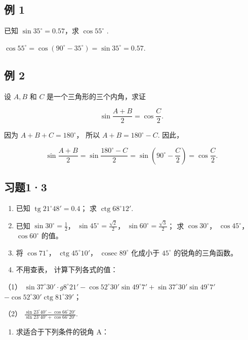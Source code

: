 \subsection{例 1}

已知 \(\sin35^{\circ}=0.57\)，求 \(\cos55^{\circ}\) .

\(\cos 55^{\circ} = \cos (90^{\circ} - 35^{\circ}) = \sin 35^{\circ} = 0.57.\)

\subsection{例 2}

设 \(A, B\) 和 \(C\) 是一个三角形的三个内角，求证

\[
\sin\frac{A+B}{2}=\cos\frac{C}{2}.
\]

 因为 \(A + B + C = 180^{\circ}\)， 所以
\(A + B = 180^{\circ} - C\). 因此，

\[
\sin \frac {A + B}{2} = \sin \frac {180 ^{\circ} - C}{2} = \sin \left(90 ^{\circ} - \frac {C}{2}\right) = \cos \frac {C}{2}.
\]

\subsection{习题1·3}

\begin{enumerate}
\item
  已知 \(\operatorname{tg} 21^{\circ}48' = 0.4\)； 求
  \(\operatorname{ctg} 68^{\circ}12'\).
\item
  已知 \(\sin 30^{\circ} = \frac{1}{2}\)，
  \(\sin 45^{\circ} = \frac{\sqrt{2}}{2}\)，
  \(\sin 60^{\circ} = \frac{\sqrt{3}}{2}\)； 求 \(\cos 30^{\circ}\)，
  \(\cos 45^{\circ}\)， \(\cos 60^{\circ}\) 的值。
\item
  将 \(\cos 71^{\circ}\)， \(\operatorname{ctg} 45^{\circ}10'\)，
  \(\operatorname{cosec} 89^{\circ}\) 化成小于 \(45^{\circ}\)
  的锐角的三角函数。
\item
  不用查表， 计算下列各式的值：
\end{enumerate}

（1）
\(\sin 37^{\circ}30' \cdot g 8^{\circ}21' - \cos 52^{\circ}30' \sin 49^{\circ}7' + \sin 37^{\circ}30' \sin 49^{\circ}7'\)
\(-\cos 52^{\circ}30' \operatorname{ctg} 81^{\circ}39'\)；

（2）
\(\frac{\sin 23^{\circ}40' - \cos 66^{\circ}20'}{\sin 23^{\circ}40' + \cos 66^{\circ}20'}\).

\begin{enumerate}[start=5]
\item
  求适合于下列条件的锐角 A：
\end{enumerate}

